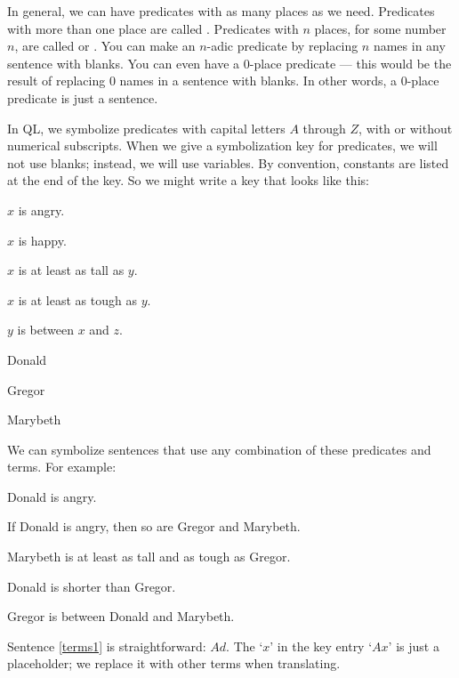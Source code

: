 In general, we can have predicates with as many places as we need. Predicates with more than one place are called . Predicates with $n$ places, for some number $n$, are called  or . You can make an $n$-adic predicate by replacing $n$ names in any sentence with blanks. You can even have a 0-place predicate --- this would be the result of replacing $0$ names in a sentence with blanks. In other words, a 0-place predicate is just a sentence.

In QL, we symbolize predicates with capital letters $A$ through $Z$, with or without numerical subscripts. When we give a symbolization key for predicates, we will not use blanks; instead, we will use variables. By convention, constants are listed at the end of the key. So we might write a key that looks like this:
\begin{groupitems}
\begin{ekey}
\item[Ax:] $x$ is angry.
\item[Hx:] $x$ is happy.
\item[T$_1$xy:] $x$ is at least as tall as $y$.
\item[T$_2$xy:] $x$ is at least as tough as $y$.
\item[Bxyz:] $y$ is between $x$ and $z$.
\item[d:] Donald
\item[g:] Gregor
\item[m:] Marybeth
\end{ekey}
\end{groupitems}

We can symbolize sentences that use any combination of these predicates and terms. For example:
\begin{earg}
\item[\ex{terms1}] Donald is angry.
\item[\ex{terms2}] If Donald is angry, then so are Gregor and Marybeth.
\item[\ex{terms3}] Marybeth is at least as tall and as tough as Gregor.
\item[\ex{terms4}] Donald is shorter than Gregor.
\item[\ex{terms5}] Gregor is between Donald and Marybeth.
\end{earg}

Sentence \ref{terms1} is straightforward: $Ad$. The `$x$' in the key entry `$Ax$' is just a placeholder; we replace it with other terms when translating.

